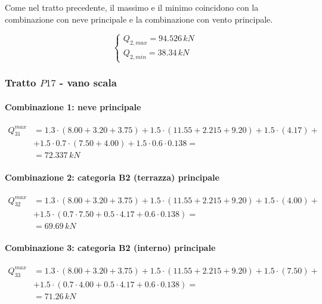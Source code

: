 Come nel tratto precedente, il massimo e il minimo coincidono con la combinazione con neve principale e la combinazione con vento principale.

\begin{equation}
		\label{eq:Q2maxmin_slu}
		\begin{cases}
			Q_{2,max} = 94.526\,kN\\
			Q_{2, min} = 38.34\,kN
		\end{cases}
\end{equation}

\subsubsection*{Tratto $P17$ - vano scala}

\paragraph{Combinazione 1: neve principale}

\begin{align*}
	Q_{31}^{max} &= 1.3\cdot(8.00+3.20 + 3.75) + 1.5\cdot(11.55+2.215 + 9.20) + 1.5\cdot(4.17) +\\
	&+1.5\cdot0.7\cdot(7.50+4.00) + 1.5\cdot0.6\cdot0.138 =\\
	&= 	72.337\,kN
\end{align*}

\paragraph{Combinazione 2: categoria B2 (terrazza) principale}

\begin{align*}
	Q_{32}^{max} &= 1.3\cdot(8.00+3.20 + 3.75) + 1.5\cdot(11.55+2.215 + 9.20) + 1.5\cdot(4.00) +\\
	&+1.5\cdot(0.7\cdot7.50+ 0.5\cdot4.17 + 0.6\cdot 0.138) =\\
	&=  69.69\,kN
\end{align*}

\paragraph{Combinazione 3: categoria B2 (interno) principale}

\begin{align*}
	Q_{33}^{max} &= 1.3\cdot(8.00+3.20 + 3.75) + 1.5\cdot(11.55+2.215 + 9.20) + 1.5\cdot(7.50) +\\
	&+1.5\cdot(0.7\cdot4.00+ 0.5\cdot4.17 + 0.6\cdot 0.138) =\\
	&=  71.26\,kN
\end{align*}

